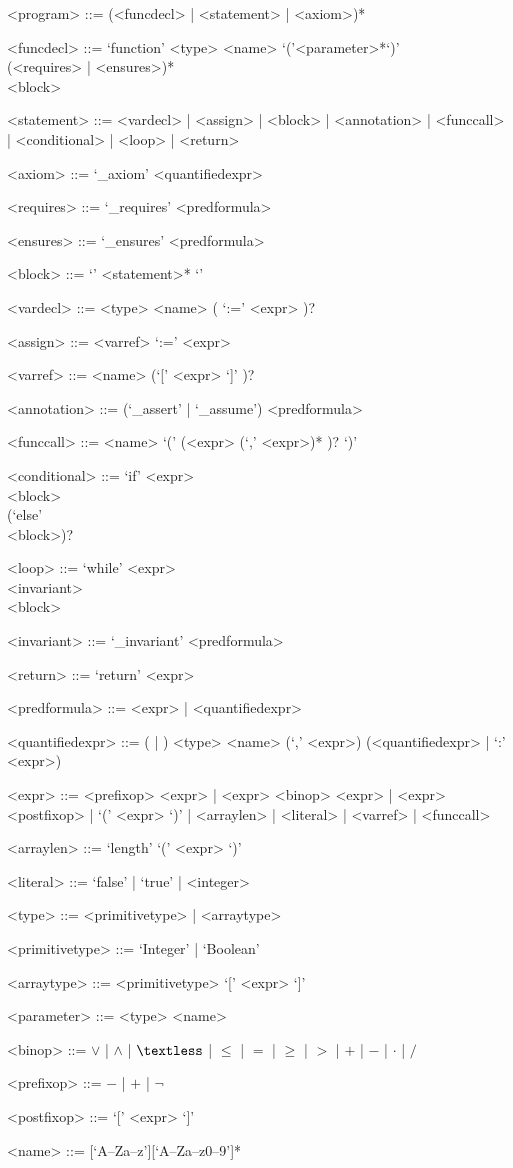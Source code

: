 \setlength{\grammarindent}{12em} %

\begin{grammar}

<program> ::= (<funcdecl> | <statement> | <axiom>)* 

<funcdecl> ::= `function' <type> <name> `('<parameter>*`)' \\ (<requires> | <ensures>)* \\ <block>

<statement> ::= <vardecl> | <assign> | <block> | <annotation> | <funccall> | <conditional> | <loop> | <return>

<axiom> ::= `_axiom' <quantifiedexpr>

<requires> ::= `_requires' <predformula>

<ensures> ::= `_ensures' <predformula>

<block> ::= `{' <statement>* `}'

<vardecl> ::= <type> <name> ( `:=' <expr> )?

<assign> ::= <varref> `:=' <expr>

<varref> ::= <name> (`[' <expr> `]' )?

<annotation> ::= (`_assert' | `_assume') <predformula>

<funccall> ::= <name> `(' (<expr> (`,' <expr>)* )? `)'

<conditional> ::= `if' <expr> \\ <block>  \\ (`else' \\ <block>)?

<loop> ::= `while' <expr> \\ <invariant> \\ <block>

<invariant> ::= `_invariant' <predformula>

<return> ::= `return' <expr>

<predformula> ::= <expr> | <quantifiedexpr>

<quantifiedexpr> ::= (\lit{$\forall$} | \lit{$\exists$} ) <type> <name> (`,' <expr>) (<quantifiedexpr> | `:' <expr>)

<expr> ::= <prefixop> <expr> | <expr> <binop> <expr> | <expr> <postfixop> | `(' <expr> `)' | <arraylen> | <literal> | <varref> | <funccall>

<arraylen> ::= `length' `(' <expr> `)'

<literal> ::= `false' | `true' | <integer>

<type> ::= <primitivetype> | <arraytype>

<primitivetype> ::= `Integer' | `Boolean'

<arraytype> ::= <primitivetype> `[' <expr> `]'

<parameter> ::= <type> <name>

<binop> ::= $\vee$ | $\wedge$ | $\textless$ | $\leq$ | $=$ | $\geq$ | $>$ | $+$ | $-$ | $\cdot$ | $/$

<prefixop> ::= $-$ | $+$ | $\neg$

<postfixop> ::= `[' <expr> `]'

<name> ::=  [`A--Za--z'][`A--Za--z0--9']*

\end{grammar}

